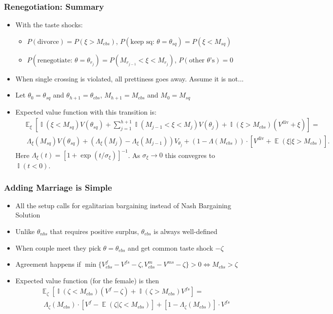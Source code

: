 \documentclass[aspectratio=169]{beamer}
\DeclareMathOperator{\E}{\mathbb{E}}
\DeclareMathOperator{\I}{\mathbb{I}}
\let\olditem\item
\renewcommand{\item}{%
\olditem\vspace{\fill}}
\begin{document}
\begin{frame}
\frametitle{Renegotiation: Summary}
\begin{itemize}
\item With the taste shocks: 
\begin{itemize}
\item $P(\text{divorce}) = P(\xi > M_{ebs})$, $P(\text{keep sq: }\theta = \theta_{sq}) = P(\xi < M_{sq})$
\item $P(\text{renegotiate: }\theta = \theta_{r_j}) = P(M_{r_{j-1}} < \xi < M_{r_j})$, $P(\text{other $\theta$'s}) = 0$
\end{itemize}
\item When single crossing is violated, all prettiness goes away. Assume it is not...
\item Let $\theta_0 = \theta_{sq}$ and $\theta_{h+1} = \theta_{ebs}$, $M_{h+1} = M_{ebs}$ and $M_0 = M_{sq}$ 
\item Expected value function with this transition is:
\begin{align*}& \E_\xi \left[ \I(\xi < M_{sq}) V(\theta_{sq}) + \sum\limits_{j=1}^{h+1} \I(M_{j-1} < \xi < M_j) V(\theta_j) + \I(\xi>M_{ebs})(V^{\text{div}} + \xi) \right] = \\
& \ \ \Lambda_\xi (M_{sq}) V(\theta_{sq}) + (\Lambda_\xi(M_{j}) - \Lambda_{\xi}(M_{j-1})) V_{\theta_j} + (1-\Lambda(M_{ebs}))\cdot [V^{\text{div}} + \E(\xi|\xi>M_{ebs})].
 \end{align*}
Here $\Lambda_\xi(t) = \left[1 + \exp\left( t / \sigma_{\xi} \right)\right]^{-1}$. As $\sigma_\xi \to 0$ this convegres to $\I(t < 0)$.
\end{itemize}
\end{frame}


\begin{frame}
\frametitle{Adding Marriage is Simple}
\begin{itemize}
\item All the setup calls for egalitarian bargaining instead of Nash Bargaining Solution
\item Unlike $\theta_{nbs}$ that requires positive surplus, $\theta_{ebs}$ is always well-defined
\item When couple meet they pick $\theta = \theta_{ebs}$ and get common taste shock $-\zeta$
\item Agreement happens if $\min\{V^{f}_{ebs} - V^{fs} - \zeta, V^m_{ebs} - V^{ms} - \zeta \} > 0 \Leftrightarrow M_{ebs} > \zeta$
\item Expected value function (for the female) is then
\begin{align*}&\E_{\zeta} \left[ \I(\zeta < M_{ebs})(V^f - \zeta) + \I(\zeta > M_{ebs}) V^{fs} \right] = \\
& \ \ \Lambda_\zeta(M_{ebs}) \cdot \left[ V^f - \E(\zeta|\zeta<M_{ebs})\right] + \left[1-\Lambda_\zeta(M_{ebs})\right]\cdot V^{fs}
\end{align*}
\end{itemize}
\end{frame}
\end{document}
